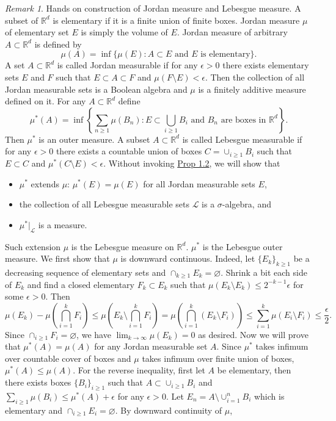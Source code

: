 \documentclass[hidelinks,11pt]{article}
\theoremstyle{definition}
\theoremstyle{dotless}
\theoremstyle{remark}
\newtheorem*{remark}{Remark}
\DeclareMathOperator{\1}{\mathbf{1}}
\begin{document}
\begin{remark}
Hands on construction of Jordan measure and Lebesgue measure.\smallbreak
A subset of $\mathbb{R}^d$ is elementary if it is a finite union of finite boxes. Jordan measure $\mu$ of elementary set $E$ is simply the volume of $E$. Jordan measure of arbitrary $A\subset\mathbb{R}^d$ is defined by
\[\mu(A)=\inf\{\mu(E):A\subset E\textrm{ and }E\textrm{ is elementary}\}.\]
A set $A\subset\mathbb{R}^d$ is called Jordan measurable if for any $\epsilon>0$ there exists elementary sets $E$ and $F$ such that $E\subset A\subset F$ and $\mu(F\setminus E)<\epsilon$. Then the collection of all Jordan measurable sets is a Boolean algebra and $\mu$ is a finitely additive measure defined on it.\medbreak
For any $A\subset\mathbb{R}^d$ define
\[\mu^\ast(A)=\inf\left\{\sum_{n\geq1}\mu(B_n):E\subset\bigcup_{i\geq1}B_i\textrm{ and }B_n\textrm{ are boxes in }\mathbb{R}^d\right\}.\]
Then $\mu^\ast$ is an outer measure. A subset $A\subset\mathbb{R}^d$ is called Lebesgue measurable if for any $\epsilon>0$ there exists a countable union of boxes $C=\cup_{i\geq1}B_i$ such that $E\subset C$ and $\mu^\ast(C\setminus E)<\epsilon$. Without invoking \hyperref[Prop 1.1]{Prop 1.2}, we will show that\begin{itemize}
    \item $\mu^*$ extends $\mu$: $\mu^\ast(E)=\mu(E)$ for all Jordan measurable sets $E$,
    \item the collection of all Lebesgue measurable sets $\mathcal{L}$ is a $\sigma$-algebra, and
    \item $\mu^\ast|_\mathcal{L}$ is a measure.
\end{itemize}
Such extension $\mu$ is the Lebesgue measure on $\mathbb{R}^d$. $\mu^\ast$ is the Lebesgue outer measure.\smallbreak
We first show that $\mu$ is downward continuous. Indeed, let $\{E_k\}_{k\geq1}$ be a decreasing sequence of elementary sets and $\cap_{k\geq1}E_k=\varnothing$. Shrink a bit each side of $E_k$ and find a closed elementary $F_k\subset E_k$ such that $\mu(E_k\setminus E_k)\leq2^{-k-1}\epsilon$ for some $\epsilon>0$. Then
\[\mu(E_k)-\mu(\bigcap_{i=1}^kF_i)\leq\mu(E_k\setminus\bigcap_{i=1}^kF_i)=\mu(\bigcap_{i=1}^k(E_k\setminus F_i))\leq\sum_{i=1}^k\mu(E_i\setminus F_i)\leq\frac{\epsilon}{2}.\]
Since $\cap_{i\geq1}F_i=\varnothing$, we have $\lim_{k\to\infty}\mu(E_k)=0$ as desired.\medbreak
Now we will prove that $\mu^\ast(A)=\mu(A)$ for any Jordan measurable set $A$. Since $\mu^*$ takes infimum over countable cover of boxes and $\mu$ takes infimum over finite union of boxes, $\mu^\ast(A)\leq\mu(A)$. For the reverse inequality, first let $A$ be elementary, then there exists boxes $\{B_i\}_{i\geq1}$ such that $A\subset\cup_{i\geq1}B_i$ and $\sum_{i\geq1}\mu(B_i)\leq\mu^\ast(A)+\epsilon$ for any $\epsilon>0$. Let $E_n=A\setminus\cup_{i=1}^nB_i$ which is elementary and $\cap_{i\geq1}E_i=\varnothing$. By downward continuity of $\mu$,

\end{remark}
\end{document}
